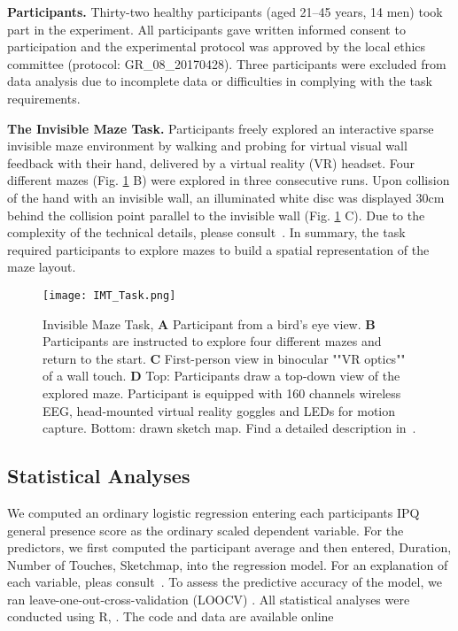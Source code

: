 
\indent \textbf{Participants.} Thirty-two healthy participants (aged 21--45 years, 14 men) took part in the
experiment. All participants gave written informed consent to participation and the experimental protocol was approved by the local ethics committee (protocol: GR\_08\_20170428). Three participants were excluded from data analysis due to incomplete data or difficulties in complying with the task requirements.

\indent \textbf{The Invisible Maze Task.} Participants freely explored an interactive sparse invisible maze environment by walking and probing for virtual visual wall feedback with their hand, delivered by a virtual reality (VR) headset. Four different mazes (Fig. \ref{imt_task} B) were explored in three consecutive runs. Upon collision of the hand with an invisible wall, an illuminated white disc was displayed 30cm behind the collision point parallel to the invisible wall (Fig. \ref{imt_task} C). Due to the complexity of the technical details, please consult~\cite{gehrke2018}. In summary, the task required participants to explore mazes to build a spatial representation of the maze layout.%

\begin{figure}[h]
\centering
\texttt{[image: IMT\_Task.png]}
\vspace{0pt}
\caption{Invisible Maze Task, \textbf{A} Participant from a bird’s eye view. \textbf{B} Participants are instructed to explore four different mazes and return to the start. \textbf{C} First-person view in binocular ""VR optics"" of a wall touch. \textbf{D} Top: Participants draw a top-down view of the explored maze. Participant is equipped with 160 channels wireless EEG, head-mounted virtual reality goggles and LEDs for motion capture. Bottom: drawn sketch map. Find a detailed description in~\cite{gehrke2018}.}
\label{imt_task}
\end{figure}

\subsection{Statistical Analyses}
We computed an ordinary logistic regression entering each participants IPQ general presence score as the ordinary scaled dependent variable. For the predictors, we first computed the participant average and then entered, Duration, Number of Touches, Sketchmap,   into the regression model. For an explanation of each variable, pleas consult~\cite{gehrke2018}. To assess the predictive accuracy of the model, we ran leave-one-out-cross-validation (LOOCV) . All statistical analyses were conducted using R, . The code and data are available online 